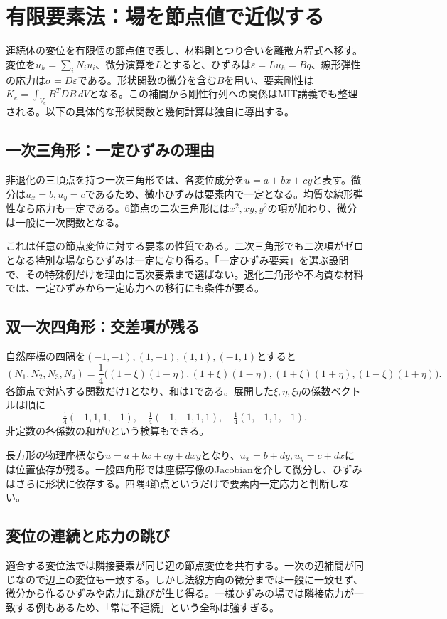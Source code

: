 \section{有限要素法：場を節点値で近似する}
\label{theory:fem:background}
連続体の変位を有限個の節点値で表し、材料則とつり合いを離散方程式へ移す。変位を$u_h=\sum_iN_i u_i$、微分演算を$L$とすると、ひずみは$\varepsilon=Lu_h=Bq$、線形弾性の応力は$\sigma=D\varepsilon$である。形状関数の微分を含む$B$を用い、要素剛性は$K_e=\int_{V_e}B^TDB\,dV$となる。この補間から剛性行列への関係はMIT講義でも整理される\parencite{mit_roy_fea1999}。以下の具体的な形状関数と幾何計算は独自に導出する。

\subsection{一次三角形：一定ひずみの理由}
\label{theory:fem:triangle}
非退化の三頂点を持つ一次三角形では、各変位成分を$u=a+bx+cy$と表す。微分は$u_x=b,u_y=c$であるため、微小ひずみは要素内で一定となる。均質な線形弾性なら応力も一定である。6節点の二次三角形には$x^2,xy,y^2$の項が加わり、微分は一般に一次関数となる。

これは任意の節点変位に対する要素の性質である。二次三角形でも二次項がゼロとなる特別な場ならひずみは一定になり得る。「一定ひずみ要素」を選ぶ設問で、その特殊例だけを理由に高次要素まで選ばない。退化三角形や不均質な材料では、一定ひずみから一定応力への移行にも条件が要る。

\subsection{双一次四角形：交差項が残る}
\label{theory:fem:q4}
自然座標の四隅を$(-1,-1),(1,-1),(1,1),(-1,1)$とすると
\[
 (N_1,N_2,N_3,N_4)=\frac14\bigl((1-\xi)(1-\eta),(1+\xi)(1-\eta),
 (1+\xi)(1+\eta),(1-\xi)(1+\eta)\bigr).
\]
各節点で対応する関数だけ1となり、和は1である。展開した$\xi,\eta,\xi\eta$の係数ベクトルは順に
\[
 \tfrac14(-1,1,1,-1),\quad\tfrac14(-1,-1,1,1),\quad
 \tfrac14(1,-1,1,-1).
\]
非定数の各係数の和が0という検算もできる。

長方形の物理座標なら$u=a+bx+cy+dxy$となり、$u_x=b+dy,u_y=c+dx$には位置依存が残る。一般四角形では座標写像のJacobianを介して微分し、ひずみはさらに形状に依存する。四隅4節点というだけで要素内一定応力と判断しない。

\subsection{変位の連続と応力の跳び}
\label{theory:fem:continuity}
適合する変位法では隣接要素が同じ辺の節点変位を共有する。一次の辺補間が同じなので辺上の変位も一致する。しかし法線方向の微分までは一般に一致せず、微分から作るひずみや応力に跳びが生じ得る。一様ひずみの場では隣接応力が一致する例もあるため、「常に不連続」という全称は強すぎる。

